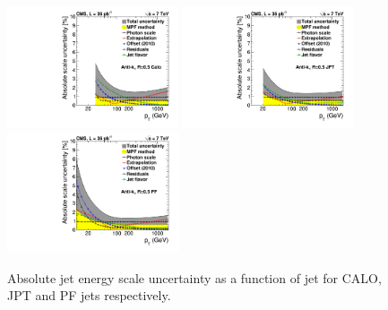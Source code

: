 \begin{figure}[ht!]
  \begin{center}
    \includegraphics[width=0.45\textwidth]{Figures/JEC/JECUncert_AK5_summary}
    \includegraphics[width=0.45\textwidth]{Figures/JEC/JECUncert_JPTAK5_summary}
    \includegraphics[width=0.45\textwidth]{Figures/JEC/JECUncert_PFAK5_summary}
    \caption{Absolute jet energy scale uncertainty as a function of jet \pt for CALO, JPT and PF jets respectively.}
    \label{fig:absunc}
  \end{center}
\end{figure}

\clearpage
